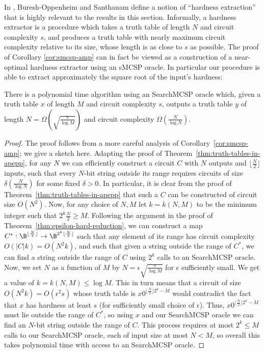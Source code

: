In \cite{hardness-harder}, Buresh-Oppenheim and Santhanam define a notion of ``hardness extraction'' that is highly relevant to the results in this section. Informally, a hardness extractor is a procedure which takes a truth table of length $N$ and circuit complexity $s$, and produces a truth table with nearly maximum circuit complexity relative to its size, whose length is as close to $s$ as possible. The proof of Corollary \ref{cor:smcsp-amp} can in fact be viewed as a construction of a near-optimal hardness extractor using an {\sc sMCSP} oracle. In particular our procedure is able to extract approximately the square root of the input's hardness:
\begin{theorem}\label{thm:hardness-extractor}
There is a polynomial time algorithm using an {\sc Search\dash MCSP} oracle which, given a truth table $x$ of length $M$ and circuit complexity $s$, outputs a truth table $y$ of length $N = {\Omega}(\sqrt{\frac{s}{\log M}})$ and circuit complexity $\Omega(\frac{N}{\log N})$.
\end{theorem}
\begin{proof}
The proof follows from a more careful analysis of Corollary~\ref{cor:smcsp-amp}; we give a sketch here. Adapting the proof of Theorem~\ref{thm:truth-tables-in-apepp}, for any $N$ we can efficiently construct a circuit $C$ with $N$ outputs and $\lfloor\frac{N}{2}\rfloor$ inputs, such that every $N$-bit string outside its range requires circuits of size $\delta(\frac{N}{\log N})$ for some fixed $\delta > 0$.
In particular, it is clear from the proof of Theorem~\ref{thm:truth-tables-in-apepp} that such a $C$ can be constructed of circuit size $O(N^2)$.
Now, for any choice of $N,M$ let $k = k(N,M)$ to be the minimum integer such that $2^k\frac{N}{2} \geq M$. Following the argument in the proof of Theorem~\ref{thm:epsilon-hard-reduction}, we can construct a map $C^*: \B^{\lfloor\frac{N}{2}\rfloor} \rightarrow \B^{2^k\lfloor\frac{N}{2}\rfloor}$ such that any element of its range has circuit complexity $O(|C|k) = O(N^2k)$, and such that given a string outside the range of $C^*$, we can find a string outside the range of $C$ using $2^k$ calls to an {\sc Search\dash MCSP} oracle. Now, we set $N$ as a function of $M$ by $N = \epsilon\sqrt{\frac{s}{\log M}}$ for $\epsilon$ sufficiently small. We get a value of $k = k(N,M) \leq \log M$. This in turn means that a circuit of size $O(N^2 k) = O(\epsilon^2 s)$ whose truth table is $x0^{\lfloor\frac{N}{2}\rfloor2^k-M}$ would contradict the fact that $x$ has hardness at least $s$ (for sufficiently small choice of $\epsilon$). Thus, $x0^{\lfloor\frac{N}{2}\rfloor2^k-M}$ must lie outside the range of $C^*$, so using $x$ and our {\sc Search\dash MCSP} oracle we can find an $N$-bit string outside the range of $C$. This process requires at most $2^k \leq M$ calls to our {\sc Search\dash MCSP} oracle, each of input size at most $N < M$, so overall this takes polynomial time with access to an {\sc Search\dash MCSP} oracle.
\end{proof}

